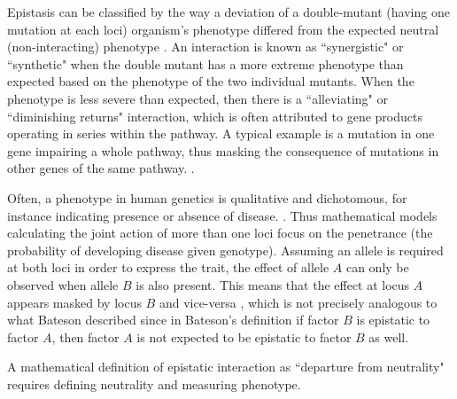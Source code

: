 Epistasis can be classified by the way a deviation of a double-mutant (having one mutation at each loci) organism's phenotype differed from the expected neutral (non-interacting) phenotype \cite{mani2008defining}.
An interaction is known as ``synergistic" or ``synthetic" when the double mutant has a more extreme phenotype than expected based on the phenotype of the two individual mutants.
When the phenotype is less severe than expected, then there is a ``alleviating" or ``diminishing returns" interaction, which is often attributed to gene products operating in series within the pathway. 
A typical example is a mutation in one gene impairing a whole pathway, thus masking the consequence of mutations in other genes of the same pathway. \cite{mani2008defining}.

Often, a phenotype in human genetics is qualitative and dichotomous, for instance indicating presence or absence of disease. \cite{cordell2002epistasis}.
Thus mathematical models calculating the joint action of more than one loci focus on the penetrance (the probability of developing disease given genotype).
Assuming an allele is required at both loci in order to express the trait, the effect of allele $A$ can only be observed when allele $B$ is also present.
This means that the effect at locus $A$ appears masked by locus $B$ and vice-versa \cite{cordell2002epistasis}, which is not precisely analogous to
what Bateson described since in Bateson's definition if factor $B$ is epistatic to factor $A$, then factor $A$ is not expected to be epistatic to factor $B$ as well.  \cite{cordell2002epistasis}

A mathematical definition of epistatic interaction as ``departure from neutrality" requires defining neutrality and measuring phenotype.

